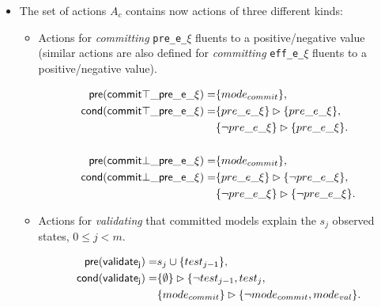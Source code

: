 \documentclass{article}
\newcommand{\pre}{\mathsf{pre}}     %
\newcommand{\cond}{\mathsf{cond}}   %
\begin{document}
\begin{itemize}
      \item The set of actions $A_c$ contains now actions of three different kinds:
\begin{itemize}
      \item Actions for {\em committing} {\tt\small pre\_e\_$\xi$} fluents to a positive/negative value (similar actions are also defined for {\em committing} {\tt\small eff\_e\_$\xi$} fluents to a positive/negative value).
\begin{small}
\begin{align*}
\hspace*{7pt}\pre(\mathsf{commit\top\_pre\_e\_\xi})=&\{mode_{commit}\},\\
\cond(\mathsf{commit\top\_pre\_e\_\xi})=&\{pre\_e\_\xi\}\rhd\{pre\_e\_\xi\},\\
                                    &\{\neg pre\_e\_\xi\}\rhd\{pre\_e\_\xi\}.\\\\
\hspace*{7pt}\pre(\mathsf{commit\bot\_pre\_e\_\xi})=&\{mode_{commit}\},\\
\cond(\mathsf{commit\bot\_pre\_e\_\xi})=&\{pre\_e\_\xi\}\rhd\{\neg pre\_e\_\xi\},\\
                                    &\{\neg pre\_e\_\xi\}\rhd\{\neg pre\_e\_\xi\}.                                    
\end{align*}
\end{small}

      \item Actions for {\em validating} that committed models explain the $s_j$ observed states, {\tt\small $0\leq j< m$}.
\begin{small}
\begin{align*}
\hspace*{7pt}\pre(\mathsf{validate_{j}})=&s_j\cup\{test_{j-1}\},\\
\cond(\mathsf{validate_{j}})=&\{\emptyset\}\rhd\{\neg test_{j-1}, test_j,\\
                            &\{mode_{commit}\}\rhd\{\neg mode_{commit}, mode_{val}\}.
\end{align*}
\end{small}


\end{itemize}
\end{itemize}
\end{document}
